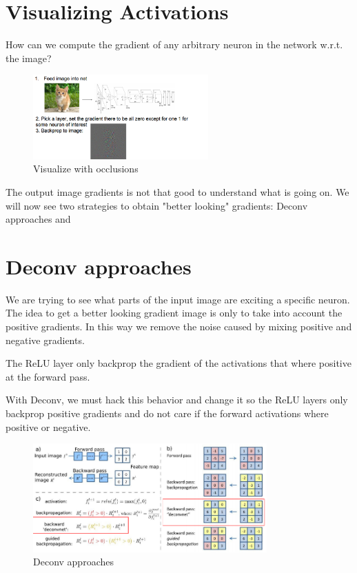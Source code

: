 \section{Visualizing Activations}
How can we compute the gradient of any arbitrary neuron in the network w.r.t. the image?

\begin{figure}[h]
  \centering
  \includegraphics[width=0.6\textwidth]{Images/visualization/4.png}
  \caption{Visualize with occlusions}
\end{figure}

The output image gradients is not that good to understand what is going on. We will now see two strategies to obtain "better looking" gradients: Deconv approaches and

\section{Deconv approaches}

We are trying to see what parts of the input image are exciting a specific neuron. The idea to get a better looking gradient image is only to take into account the positive gradients. In this way we remove the noise caused by mixing positive and negative gradients.

The ReLU layer only backprop the gradient of the activations that where positive at the forward pass.

With Deconv, we must hack this behavior and change it so the ReLU layers only backprop positive gradients and do not care if the forward activations where positive or negative.

\begin{figure}[h]
  \centering
  \includegraphics[width=0.8\textwidth]{Images/visualization/5.png}
  \caption{Deconv approaches}
\end{figure}

